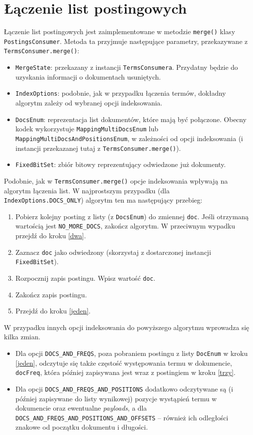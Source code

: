 \section{Łączenie list postingowych}

Łączenie list postingowych jest zaimplementowane w metodzie \texttt{merge()} klasy \texttt{PostingsConsumer}. Metoda ta przyjmuje następujące parametry, przekazywane z \texttt{TermsConsumer.merge()}:
\begin{itemize}
 \item \texttt{MergeState}: przekazany z instancji \texttt{TermsConsumera}. Przydatny będzie do uzyskania informacji o dokumentach usuniętych.
 \item \texttt{IndexOptions}: podobnie, jak w przypadku łączenia termów, dokładny algorytm zależy od wybranej opcji indeksowania.
 \item \texttt{DocsEnum}: reprezentacja list dokumentów, które mają być połączone. Obecny kodek wykorzystuje \texttt{MappingMultiDocsEnum} lub \texttt{MappingMultiDocsAndPositionsEnum}, w zależności od opcji indeksowania (i instancji przekazanej tutaj z \texttt{TermsConsumer.merge()}). 
 \item \texttt{FixedBitSet}: zbiór bitowy reprezentujący odwiedzone już dokumenty.
\end{itemize}

Podobnie, jak w \texttt{TermsConsumer.merge()} opcje indeksowania wpływają na algorytm łączenia list. W najprostszym przypadku (dla \texttt{IndexOptions.DOCS\_ONLY}) algorytm ten ma następujący przebieg:
\begin{enumerate}
 \item \label{jeden} Pobierz kolejny posting z listy (z \texttt{DocsEnum}) do zmiennej \texttt{doc}. Jeśli otrzymaną wartością jest \texttt{NO\_MORE\_DOCS}, zakończ algorytm. W przeciwnym wypadku przejdź do kroku \ref{dwa}.
 \item \label{dwa} Zaznacz \texttt{doc} jako odwiedzony (skorzystaj z dostarczonej instancji \texttt{FixedBitSet}).
 \item \label{trzy} Rozpocznij zapis postingu. Wpisz wartość \texttt{doc}.
 \item Zakończ zapis postingu.
 \item Przejdź do kroku \ref{jeden}.
\end{enumerate}

W przypadku innych opcji indeksowania do powyższego algorytmu wprowadza się kilka zmian.
\begin{itemize}
 \item Dla opcji \texttt{DOCS\_AND\_FREQS}, poza pobraniem postingu z listy \texttt{DocEnum} w kroku \ref{jeden}, odczytuje się także częstość występowania termu w dokumencie, \texttt{docFreq}, która później zapisywana jest wraz z postingiem w kroku \ref{trzy}.
 \item Dla opcji \texttt{DOCS\_AND\_FREQS\_AND\_POSITIONS} dodatkowo odczytywane są (i później zapisywane do listy wynikowej) pozycje wystąpień termu w dokumencie oraz ewentualne \emph{payloads}, a dla \texttt{DOCS\_AND\_FREQS\_AND\_POSITIONS\_AND\_OFFSETS} -- również ich odległości znakowe od początku dokumentu i długości.
\end{itemize}

